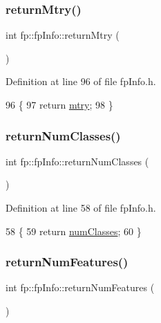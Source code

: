 \subsubsection{\texorpdfstring{return\+Mtry()}{returnMtry()}}
{\footnotesize\ttfamily int fp\+::fp\+Info\+::return\+Mtry (\begin{DoxyParamCaption}{ }\end{DoxyParamCaption})\hspace{0.3cm}{\ttfamily [inline]}}



Definition at line 96 of file fp\+Info.\+h.


\begin{DoxyCode}
96                                    \{
97                 \textcolor{keywordflow}{return} \hyperlink{classfp_1_1fpInfo_a62cccc1eb5641ebec2a6cc86cf03eedf}{mtry};
98             \}
\end{DoxyCode}
\mbox{\label{classfp_1_1fpInfo_a641516fa21a5d6170f74426cf9e2b255}} 
\subsubsection{\texorpdfstring{return\+Num\+Classes()}{returnNumClasses()}}
{\footnotesize\ttfamily int fp\+::fp\+Info\+::return\+Num\+Classes (\begin{DoxyParamCaption}{ }\end{DoxyParamCaption})\hspace{0.3cm}{\ttfamily [inline]}}



Definition at line 58 of file fp\+Info.\+h.


\begin{DoxyCode}
58                                          \{
59                 \textcolor{keywordflow}{return} \hyperlink{classfp_1_1fpInfo_a1c98a9ced12230f21003f78d742625a3}{numClasses};
60             \}
\end{DoxyCode}
\mbox{\label{classfp_1_1fpInfo_abf1e1bfc3e7daa178f3d68bed6311edb}} 
\subsubsection{\texorpdfstring{return\+Num\+Features()}{returnNumFeatures()}}
{\footnotesize\ttfamily int fp\+::fp\+Info\+::return\+Num\+Features (\begin{DoxyParamCaption}{ }\end{DoxyParamCaption})\hspace{0.3cm}{\ttfamily [inline]}}



